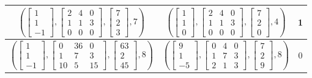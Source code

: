 \documentclass[11pt,letterpaper]{amsart}
\begin{document}
\begin{example}
\begin{center}
\begin{tabular}{|c|c|c|}
        \hline
        $\left(\begin{bmatrix} 1 \\ 1 \\ -1\end{bmatrix}, \begin{bmatrix} 2 & 4 & 0 \\ 1 & 1 & 3 \\ 0 & 0 & 0\end{bmatrix}, \begin{bmatrix} 7 \\ 2 \\ 3\end{bmatrix}, 7\right)$ & $\left(\begin{bmatrix} 1 \\ 1 \\ 0\end{bmatrix}, \begin{bmatrix} 2 & 4 & 0 \\ 1 & 1 & 3 \\ 0 & 0 & 0\end{bmatrix}, \begin{bmatrix} 7 \\ 2 \\ 0\end{bmatrix}, 4\right)$ & 1\\
        \hline
        $\left(\begin{bmatrix} 1 \\ 1 \\ -1\end{bmatrix}, \begin{bmatrix} 0 & 36 & 0 \\ 1 & 7 & 3 \\ 10 & 5 & 15\end{bmatrix}, \begin{bmatrix} 63 \\ 2 \\ 45\end{bmatrix}, 8\right)$ & $\left(\begin{bmatrix} 9 \\ 1 \\ -5\end{bmatrix}, \begin{bmatrix} 0 & 4 & 0 \\ 1 & 7 & 3 \\ 2 & 1 & 3\end{bmatrix}, \begin{bmatrix} 7 \\ 2 \\ 9\end{bmatrix}, 8\right)$ & 0\\
        \hline
    \end{tabular}
\end{center}
\end{example}
\end{document}
